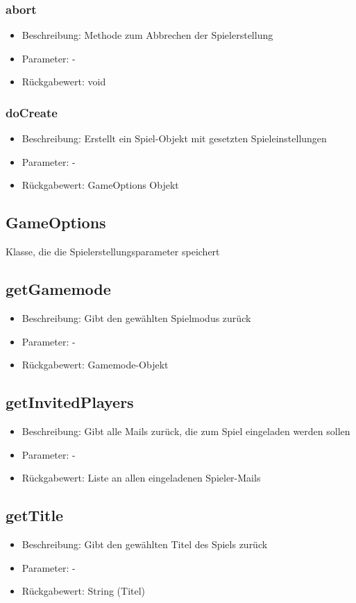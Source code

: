 \documentclass[a4paper]{scrreprt}
\begin{document}
	\subsubsection{abort}
	\begin{itemize}
		\item Beschreibung: Methode zum Abbrechen der Spielerstellung
		\item Parameter: -
		\item Rückgabewert: void
	\end{itemize}
	\subsubsection{doCreate}
	\begin{itemize}
		\item Beschreibung: Erstellt ein Spiel-Objekt mit gesetzten Spieleinstellungen
		\item Parameter: -
		\item Rückgabewert: GameOptions Objekt
	\end{itemize}

	\subsection{GameOptions}
	Klasse, die die Spielerstellungsparameter speichert
	\subsection{getGamemode}
	\begin{itemize}
		\item Beschreibung: Gibt den gewählten Spielmodus zurück
		\item Parameter: -
		\item Rückgabewert: Gamemode-Objekt
	\end{itemize}
	\subsection{getInvitedPlayers}
	\begin{itemize}
		\item Beschreibung: Gibt alle Mails zurück, die zum Spiel eingeladen werden sollen
		\item Parameter: -
		\item Rückgabewert: Liste an allen eingeladenen Spieler-Mails
	\end{itemize}
	\subsection{getTitle}
	\begin{itemize}
		\item Beschreibung: Gibt den gewählten Titel des Spiels zurück
		\item Parameter: -
		\item Rückgabewert: String (Titel)
	\end{itemize}
\end{document}
